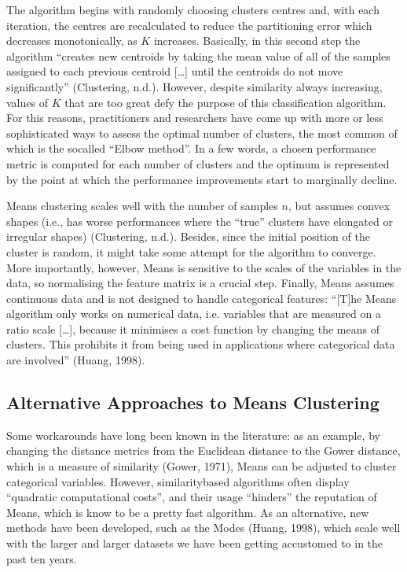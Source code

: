 \documentclass[letterpaper,10pt,english]{jupyterBook}
\begin{document}
\sphinxAtStartPar
The algorithm begins with randomly choosing clusters centres and, with each iteration, the centres are re\sphinxhyphen{}calculated to reduce the partitioning error \sphinxhyphen{} which decreases monotonically, as \(K\) increases. Basically, in this second step the algorithm “creates new centroids by taking the mean value of all of the samples assigned to each previous centroid {[}…{]} until the centroids do not move significantly” (Clustering, n.d.). However, despite similarity always increasing, values of \(K\) that are too great defy the purpose of this classification algorithm. For this reasons, practitioners and researchers have come up with more or less sophisticated ways to assess the optimal number of clusters, the most common of which is the so\sphinxhyphen{}called “Elbow method”. In a few words, a chosen performance metric is computed for each number of clusters and the optimum is represented by the point at which the performance improvements start to marginally decline.

\sphinxAtStartPar
{}\sphinxhyphen{}Means clustering scales well with the number of samples \(n\), but assumes convex shapes (i.e., has worse performances where the “true” clusters have elongated or irregular shapes) (Clustering, n.d.). Besides, since the initial position of the cluster is random, it might take some attempt for the algorithm to converge. More importantly, however, \sphinxhyphen{}Means is sensitive to the scales of the variables in the data, so normalising the feature matrix is a crucial step. Finally, \sphinxhyphen{}Means assumes continuous data and is not designed to handle categorical features: “{[}T{]}he \sphinxhyphen{}Means algorithm only works on numerical data, i.e. variables that are measured on a ratio scale {[}…{]}, because it minimises a cost function by changing the means of clusters. This prohibits it from being used in applications where categorical data are involved” (Huang, 1998).


\subsection{Alternative Approaches to \sphinxhyphen{}Means Clustering}
\label{\detokenize{04-stations_kmeans:alternative-approaches-to-k-means-clustering}}
\sphinxAtStartPar
Some workarounds have long been known in the literature: as an example, by changing the distance metrics from the Euclidean distance to the Gower distance, which is a measure of similarity (Gower, 1971), \sphinxhyphen{}Means can be adjusted to cluster categorical variables. However, similarity\sphinxhyphen{}based algorithms often display “quadratic computational costs”, and their usage “hinders” the reputation of \sphinxhyphen{}Means, which is know to be a pretty fast algorithm. As an alternative, new methods have been developed, such as the \sphinxhyphen{}Modes (Huang, 1998), which scale well with the larger and larger datasets we have been getting accustomed to in the past ten years.
\end{document}
